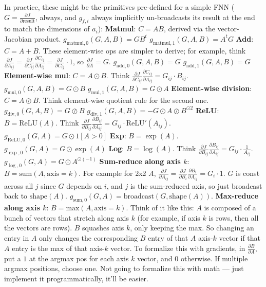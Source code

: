 \documentclass[12pt]{article}
\begin{document}
\begin{outline}
In practice, these might be the primitives pre-defined for a simple FNN ($G = \displaystyle \frac{\partial J}{\partial \text{result}}$, always, and $g_{f,i}$ always implicitly un-broadcasts its result at the end to match the dimensions of $a_i$):
\1 \textbf{Matmul}: $C = AB$, derived via the vector-Jacobian product.
\2 $g_{\text{matmul},0}(G,A,B) = GB^t$
\2 $g_{\text{matmul},1}(G,A,B) = A^t G$
\1 \textbf{Add}: $C = A+B$. These element-wise ops are simpler to derive; for example, think $\displaystyle \frac{\partial J}{\partial A_{ij}} = \frac{\partial J}{\partial C_{ij}} \frac{\partial C_{ij}}{\partial A_{ij}} = \frac{\partial J}{\partial C_{ij}} \cdot 1$, so $\displaystyle \frac{\partial J}{\partial A} = G$.
\2 $g_{\text{add},0}(G,A,B) = G$
\2 $g_{\text{add},1}(G,A,B) = G$
\1 \textbf{Element-wise mul}: $C = A \odot B$. Think $\displaystyle \frac{\partial J}{\partial C_{ij}} \frac{\partial C_{ij}}{\partial A_{ij}} = G_{ij} \cdot B_{ij}$.
\2 $g_{\text{mul},0}(G,A,B) = G \odot B$
\2 $g_{\text{mul},1}(G,A,B) = G \odot A$
\1 \textbf{Element-wise division}: $C = A \oslash B$. Think element-wise quotient rule for the second one.
\2 $g_{\text{div},0}(G,A,B) = G \oslash B$
\2 $g_{\text{div},1}(G,A,B) = -G \odot A \oslash B^{\odot 2}$
\1 \textbf{ReLU}: $B = \text{ReLU}(A)$. Think $\displaystyle \frac{\partial J}{\partial B_{ij}} \frac{\partial B_{ij}}{\partial A_{ij}} = G_{ij} \cdot \text{ReLU}'(A_{ij})$.
\2 $g_{\text{ReLU},0}(G,A) = G \odot 1[A>0]$
\1 \textbf{Exp}: $B = \exp(A)$.
\2 $g_{\exp,0}(G,A) = G \odot \exp(A)$
\1 \textbf{Log}: $B = \log(A)$. Think $\displaystyle \frac{\partial J}{\partial B_{ij}} \frac{\partial B_{ij}}{\partial A_{ij}} = G_{ij} \cdot \frac{1}{A_{ij}}$.
\2 $g_{\log,0}(G,A) = G \odot A^{\odot (-1)}$
\1 \textbf{Sum-reduce along axis $k$}: $B = \text{sum}(A, \text{axis}=k)$. For example for 2x2 $A$, $\displaystyle \frac{\partial J}{\partial A_{ij}} = \frac{\partial J}{\partial B_i} \frac{\partial B_i}{\partial A_{ij}} = G_i \cdot 1$. $G$ is const across all $j$ since $G$ depends on $i$, and $j$ is the sum-reduced axis, so just broadcast back to $\text{shape}(A)$.
\2 $g_{\text{sum},0}(G,A) = \text{broadcast}(G, \text{shape}(A))$.
\1 \textbf{Max-reduce along axis $k$}: $B = \text{max}(A, \text{axis}=k)$. Think of it like this: $A$ is composed of a bunch of vectors that stretch along axis $k$ (for example, if axis $k$ is rows, then all the vectors are rows). $B$ squashes axis $k$, only keeping the max. So changing an entry in $A$ only changes the corresponding $B$ entry of that $A$ axis-$k$ vector if that $A$ entry is the max of that axis-$k$ vector. To formalize this with gradients, in $\displaystyle \frac{\partial B}{\partial A}$, put a $1$ at the argmax pos for each axis $k$ vector, and $0$ otherwise. If multiple argmax positions, choose one.
\2 Not going to formalize this with math --- just implement it programmatically, it'll be easier.
\\\0

\end{outline}
\end{document}
